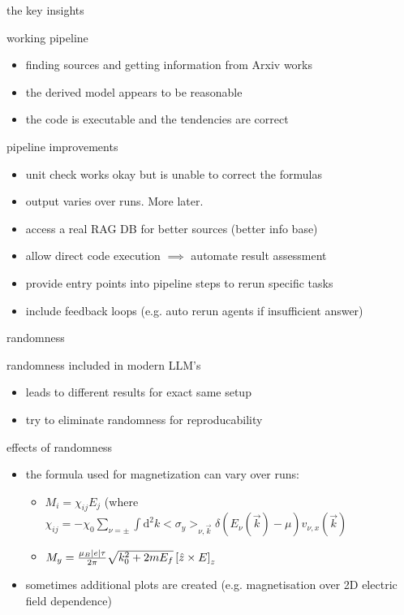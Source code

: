 \documentclass[t,
10pt,
handout, %
]{beamer}
\numberwithin{equation}{section}
\begin{document}
	\begin{frame}[c]{the key insights}
		\begin{block}{working pipeline}
			\begin{itemize}
				\item finding sources and getting information from Arxiv works
				\item the derived model appears to be reasonable
				\item the code is executable and the tendencies are correct
			\end{itemize}
		\end{block}
		\pause
		\begin{alertblock}{pipeline improvements}
			\begin{itemize}
				\item {\color{blue}unit check works okay but is unable to correct the formulas}
				\item {\color{blue}output varies over runs. More later.}\pause
				\item access a real RAG DB for better sources (better info base)
				\item allow direct code execution $\implies$ automate result assessment
				\item provide entry points into pipeline steps to rerun specific tasks
				\item include feedback loops (e.g. auto rerun agents if insufficient answer)
			\end{itemize}
		\end{alertblock}		
	\end{frame}
	
	\begin{frame}[c]{randomness}
		\begin{block}{randomness}
			included in modern LLM's
			\begin{itemize}
				\item leads to different results for exact same setup
				\item try to eliminate randomness for reproducability
			\end{itemize}
		\end{block}\pause
		
		\begin{exampleblock}{effects of randomness}
			\begin{itemize}
				\item the formula used for magnetization can vary over runs:
				\begin{itemize}
					\item $M_i = \chi_{ij}E_j$ (where $\chi_{ij} = -\chi_0 \sum_{\nu = \pm} \int \mathrm{d}^2k <\sigma_y>_{\nu,\vec{k}} \delta(E_\nu(\vec{k}) - \mu)v_{\nu,x}(\vec{k})$
					\item[or] $M_y = \frac{\mu_B \abs{e} \tau}{2 \pi} \sqrt{k_0^2 + 2mE_f}\left[\hat{z} \times {\boldmath E}\right]_z$
				\end{itemize}
				\item sometimes additional plots are created (e.g. magnetisation over 2D electric field dependence)
			\end{itemize}
		\end{exampleblock}		
	\end{frame}
	
\end{document}
